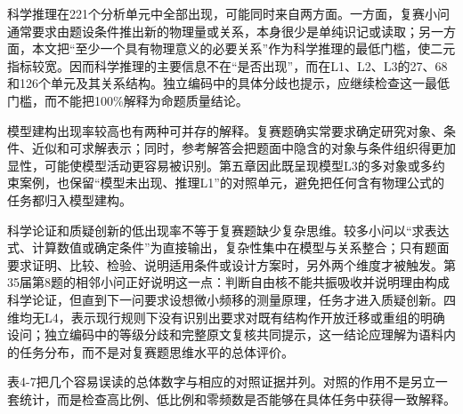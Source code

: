 \documentclass[
  12pt,
  a4paper,twoside,openany]{ctexbook}
\begin{document}
科学推理在221个分析单元中全部出现，可能同时来自两方面。一方面，复赛小问通常要求由题设条件推出新的物理量或关系，本身很少是单纯识记或读取；另一方面，本文把``至少一个具有物理意义的必要关系''作为科学推理的最低门槛，使二元指标较宽。因而科学推理的主要信息不在``是否出现''，而在L1、L2、L3的27、68和126个单元及其关系结构。独立编码中的具体分歧也提示，应继续检查这一最低门槛，而不能把100\%解释为命题质量结论。

模型建构出现率较高也有两种可并存的解释。复赛题确实常要求确定研究对象、条件、近似和可求解表示；同时，参考解答会把题面中隐含的对象与条件组织得更加显性，可能使模型活动更容易被识别。第五章因此既呈现模型L3的多对象或多约束案例，也保留``模型未出现、推理L1''的对照单元，避免把任何含有物理公式的任务都归入模型建构。

科学论证和质疑创新的低出现率不等于复赛题缺少复杂思维。较多小问以``求表达式、计算数值或确定条件''为直接输出，复杂性集中在模型与关系整合；只有题面要求证明、比较、检验、说明适用条件或设计方案时，另外两个维度才被触发。第35届第8题的相邻小问正好说明这一点：判断自由核不能共振吸收并说明理由构成科学论证，但直到下一问要求设想微小频移的测量原理，任务才进入质疑创新。四维均无L4，表示现行规则下没有识别出要求对既有结构作开放迁移或重组的明确设问；独立编码中的等级分歧和完整原文复核共同提示，这一结论应理解为语料内的任务分布，而不是对复赛题思维水平的总体评价。

表4-7把几个容易误读的总体数字与相应的对照证据并列。对照的作用不是另立一套统计，而是检查高比例、低比例和零频数是否能够在具体任务中获得一致解释。
\end{document}
